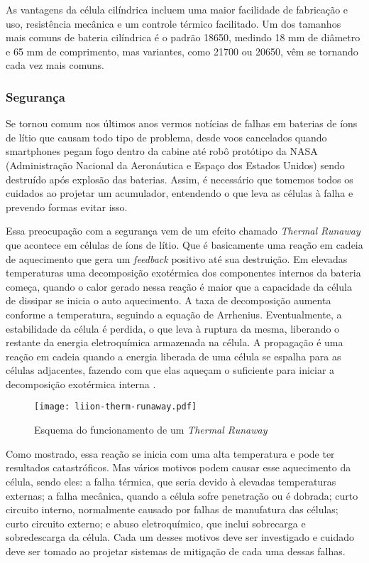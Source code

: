          As vantagens da célula cilíndrica incluem uma maior facilidade de fabricação e uso, resistência mecânica e um controle térmico facilitado. Um dos tamanhos mais comuns de bateria cilíndrica é o padrão 18650, medindo 18 mm de diâmetro e 65 mm de comprimento, mas variantes, como 21700 ou 20650, vêm se tornando cada vez mais comuns.

      \subsubsection{Segurança}
         Se tornou comum nos últimos anos vermos notícias de falhas em baterias de íons de lítio que causam todo tipo de problema, desde voos cancelados quando smartphones pegam fogo dentro da cabine até robô protótipo da NASA (Administração Nacional da Aeronáutica e Espaço dos Estados Unidos) sendo destruído após explosão das baterias. Assim, é necessário que tomemos todos os cuidados ao projetar um acumulador, entendendo o que leva as células à falha e prevendo formas evitar isso.

         Essa preocupação com a segurança vem de um efeito chamado \textit{Thermal Runaway} que acontece em células de íons de lítio. Que é basicamente uma reação em cadeia de aquecimento que gera um \textit{feedback} positivo até sua destruição. Em elevadas temperaturas uma decomposição exotérmica dos componentes internos da bateria começa, quando o calor gerado nessa reação é maior que a capacidade da célula de dissipar se inicia o auto aquecimento. A taxa de decomposição aumenta conforme a temperatura, seguindo a equação de Arrhenius. Eventualmente, a estabilidade da célula é perdida, o que leva à ruptura da mesma, liberando o restante da energia eletroquímica armazenada na célula. A propagação é uma reação em cadeia quando a energia liberada de uma célula se espalha para as células adjacentes, fazendo com que elas aqueçam o suficiente para iniciar a decomposição exotérmica interna \cite{Wal18}.

         \begin{figure}[!htb]
            \centering
            \texttt{[image: liion-therm-runaway.pdf]}
            \caption{Esquema do funcionamento de um \textit{Thermal Runaway}}
            \label{fig:liion-therm-runaway.pdf}
         \end{figure}

         Como mostrado, essa reação se inicia com uma alta temperatura e pode ter resultados catastróficos. Mas vários motivos podem causar esse aquecimento da célula, sendo eles: a falha térmica, que seria devido à elevadas temperaturas externas; a falha mecânica, quando a célula sofre penetração ou é dobrada; curto circuito interno, normalmente causado por falhas de manufatura das células; curto circuito externo; e abuso eletroquímico, que inclui sobrecarga e sobredescarga da célula. Cada um desses motivos deve ser investigado e cuidado deve ser tomado ao projetar sistemas de mitigação de cada uma dessas falhas.


